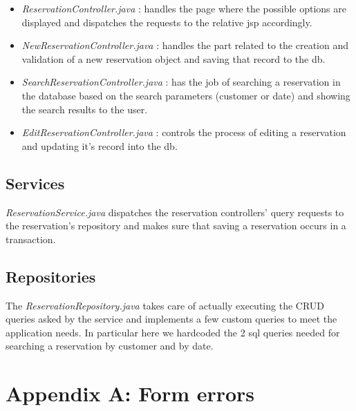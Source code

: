 \documentclass{article}
\begin{document}
    \begin{itemize}
        \item \textit{ReservationController.java} : handles the page where the possible
        options are displayed and dispatches the requests to the relative jsp accordingly.

        \item \textit{NewReservationController.java} : handles the part related to the
        creation and validation of a new reservation object and saving that
        record to the db.

        \item \textit{SearchReservationController.java} : has the job of searching a
        reservation in the database based on the search parameters (customer or date) and
        showing the search results to the user.

        \item \textit{EditReservationController.java} : controls the process of editing
        a reservation and updating it's record into the db.

    \end{itemize}



    \subsection*{Services}
    \textit{ReservationService.java} dispatches the reservation controllers' query requests to the reservation's repository
    and makes sure that saving a reservation occurs in a transaction.


    \subsection*{Repositories}
    The \textit{ReservationRepository.java} takes care of actually executing the CRUD queries
    asked by the service and implements a few custom queries to meet the application needs.
    In particular here we hardcoded the 2 sql queries needed for searching a reservation
    by customer and by date.








    \newpage
    \section*{Appendix A: Form errors}
\end{document}
